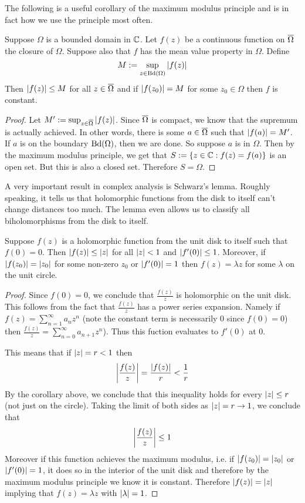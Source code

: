 The following is a useful corollary of the maximum modulus principle and is in fact how we use the principle most often.
\begin{corollary}\label{cor:max-mod-prin-cor}
Suppose $\Omega$ is a bounded domain in $\mathbb{C}$. Let $f(z)$ be a continuous function on $\overline{\Omega}$ the closure of $\Omega$. 
Suppose also that $f$ has the mean value property in $\Omega$. Define
$$ M := \sup_{z \in \mathrm{Bd}(\Omega)} \left|f(z)\right| $$
Then $\left|f(z)\right| \leq M$ for all $z \in \overline{\Omega}$ and if $\left|f(z_0)\right| = M$ for some $z_0 \in \Omega$ then $f$ is constant.
\end{corollary}
\begin{proof}
Let $M' := \sup_{z \in \overline{\Omega}} \left|f(z)\right|$. Since $\overline{\Omega}$ is compact, we know that the supremum is actually achieved. In other words, there is some $a \in \overline{\Omega}$ such that $\left|f(a)\right| = M'$. If $a$ is on the boundary $\mathrm{Bd}(\Omega)$, then we are done. So suppose $a$ is in $\Omega$. Then by the maximum modulus principle, we get that $S := \{z \in \mathbb{C} : f(z) = f(a)\}$ is an open set. But this is also a closed set. Therefore $S = \Omega$.
\end{proof}

A very important result in complex analysis is Schwarz's lemma. Roughly speaking, it tells us that holomorphic functions from the disk to itself can't change distances too much. The lemma even allows us to classify all biholomorphisms from the disk to itself.
\begin{theorem}
Suppose $f(z)$ is a holomorphic function from the unit disk to itself such that $f(0) = 0$. Then $\left|f(z)\right| \leq \left|z\right|$ for all $\left|z\right| < 1$ and $\left|f'(0)\right| \leq 1$. Moreover, if $\left|f(z_0)\right| = \left|z_0\right|$ for some non-zero $z_0$ or $\left|f'(0)\right| = 1$ then $f(z) = \lambda z$ for some $\lambda$ on the unit circle.
\end{theorem}
\begin{proof}
Since $f(0) = 0$, we conclude that $\frac{f(z)}{z}$ is holomorphic on the unit disk. This follows from the fact that $\frac{f(z)}{z}$ has a power series expansion. Namely if $f(z) = \sum_{n = 1}^\infty a_n z^n$ (note the constant term is necessarily 0 since $f(0) = 0$) then $\frac{f(z)}{z} = \sum_{n = 0}^\infty a_{n + 1} z^n$). Thus this fuction evaluates to $f'(0)$ at 0. 

This means that if $\left|z\right| = r < 1$ then
$$ \left|\frac{f(z)}{z}\right| = \frac{\left|f(z)\right|}{r} < \frac{1}{r} $$
By the corollary above, we conclude that this inequality holds for every $\left|z\right| \leq r$ (not just on the circle). Taking the limit of both sides as $\left|z\right| = r \to 1$, we conclude that 
$$ \left|\frac{f(z)}{z}\right| \leq 1 $$
Moreover if this function achieves the maximum modulus, i.e. if $\left|f(z_0)\right| = \left|z_0\right|$ or $\left|f'(0)\right| = 1$, it does so in the interior of the unit disk and therefore by the maximum modulus principle we know it is constant. Therefore $\left|f(z)\right| = \left|z\right|$ implying that $f(z) = \lambda z$ with $\left|\lambda\right| = 1$.
\end{proof}